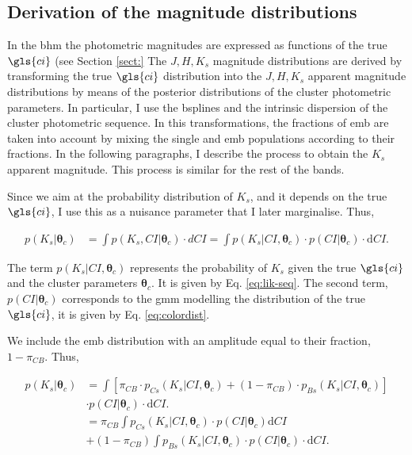 \subsection{Derivation of the magnitude distributions}
\label{subsect:deriveluminosity}

In the \gls{bhm} the photometric magnitudes are expressed as functions of the true $\gls{ci}$ (see Section \ref{sect:}
The $J,H,K_s$ magnitude distributions are derived by transforming the true $\gls{ci}$ distribution into the $J,H,K_s$ apparent magnitude distributions by means of the posterior distributions of the cluster photometric parameters. In particular, I use the \glspl{bspline} and the intrinsic dispersion of the cluster photometric sequence. In this transformations, the fractions of \gls{emb} are taken into account by mixing the single and \gls{emb} populations according to their fractions. In the following paragraphs, I describe the process to obtain the $K_s$ apparent magnitude. This process is similar for the rest of the bands. 

Since we aim at the probability distribution of $K_s$, and it depends on the true $\gls{ci}$, I use this as a nuisance parameter that I later marginalise. Thus, 

\begin{align}
p(K_s | \boldsymbol{\theta}_c) & = \int p(K_s,CI | \boldsymbol{\theta}_c) \cdot dCI =  \int p(K_s | CI ,\boldsymbol{\theta}_c) \cdot p(CI|\boldsymbol{\theta}_c)\cdot \mathrm{d}CI. \nonumber
\end{align}

The term $p(K_s | CI ,\boldsymbol{\theta}_c)$ represents the probability of $K_s$ given the true $\gls{ci}$ and the cluster parameters $\boldsymbol{\theta}_c$. It is given by Eq. \ref{eq:lik-seq}. The second term, $p(CI|\boldsymbol{\theta}_c)$ corresponds to the \gls{gmm} modelling the distribution of the true $\gls{ci}$, it is given by Eq. \ref{eq:colordist}. 

We include the \gls{emb}  distribution with an amplitude equal to their fraction, $1-\pi_{CB}$. Thus,

\begin{align}
p(K_s | \boldsymbol{\theta}_c) & =  \int \left[\pi_{CB}\cdot p_{Cs}(K_s| CI, \boldsymbol{\theta}_c) + (1-\pi_{CB})\cdot p_{Bs}(K_s| CI, \boldsymbol{\theta}_c)\right]\nonumber \\& \cdot p(CI|\boldsymbol{\theta}_c)\cdot \mathrm{d}CI. \nonumber \\
& =   \pi_{CB} \int p_{Cs}(K_s| CI, \boldsymbol{\theta}_c) \cdot p(CI|\boldsymbol{\theta}_c) \mathrm{d}CI \nonumber \\
&+ (1-\pi_{CB})\int p_{Bs}(K_s| CI, \boldsymbol{\theta}_c) \cdot p(CI|\boldsymbol{\theta}_c)\cdot  \mathrm{d}CI. \nonumber \\
\end{align}

